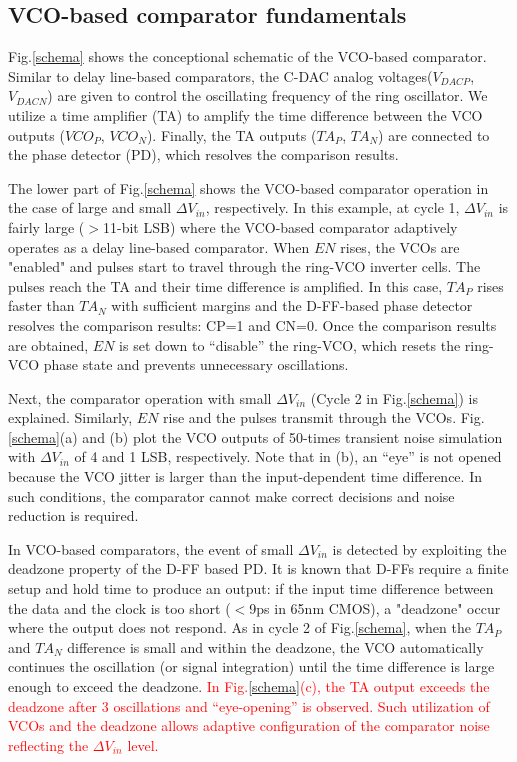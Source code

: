 \documentclass[journal]{IEEEtran}
\begin{document}
\subsection{VCO-based comparator fundamentals}
Fig.\ref{schema} shows the conceptional schematic of the VCO-based comparator. Similar to delay line-based comparators\cite{agnes20089}, the C-DAC analog voltages($V_{DACP}$, $V_{DACN}$) are given to control the oscillating frequency of the ring oscillator. We utilize a time amplifier (TA)\cite{lee20089} to amplify the time difference between the VCO outputs ($VCO_P$, $VCO_N$). Finally, the TA outputs ($TA_P$, $TA_N$) are connected to the phase detector (PD), which resolves the comparison results.

The lower part of Fig.\ref{schema} shows the VCO-based comparator operation in the case of large and small $\Delta V_{in}$, respectively. In this example, at cycle 1, $\Delta V_{in}$ is fairly large ($>$11-bit LSB) where the VCO-based comparator adaptively operates as a delay line-based comparator. When $EN$ rises, the VCOs are "enabled" and pulses start to travel through the ring-VCO inverter cells. The pulses reach the TA and their time difference is amplified. In this case, $TA_P$ rises faster than $TA_N$ with sufficient margins and the D-FF-based phase detector resolves the comparison results: CP=1 and CN=0. Once the comparison results are obtained, $EN$ is set down to “disable” the ring-VCO, which resets the ring-VCO phase state and prevents unnecessary oscillations.

Next, the comparator operation with small $\Delta V_{in}$ (Cycle 2 in Fig.\ref{schema}) is explained. Similarly, $EN$ rise and the pulses transmit through the VCOs. Fig.\ref{schema}(a) and (b) plot the VCO outputs of 50-times transient noise simulation with $\Delta V_{in}$ of 4 and 1 LSB, respectively. Note that in (b), an “eye” is not opened because the VCO jitter is larger than the input-dependent time difference. In such conditions, the comparator cannot make correct decisions and noise reduction is required.

In VCO-based comparators, the event of small $\Delta V_{in}$ is detected by exploiting the deadzone property of the D-FF based PD. It is known that D-FFs require a finite setup and hold time to produce an output: if the input time difference between the data and the clock is too short ($<$9ps in 65nm CMOS), a "deadzone" occur where the output does not respond.
As in cycle 2 of Fig.\ref{schema}, when the $TA_P$ and $TA_N$ difference is small and within the deadzone, the VCO automatically continues the oscillation (or signal integration) until the time difference is large enough to exceed the deadzone. \textcolor{red}{In Fig.\ref{schema}(c), the TA output exceeds the deadzone after 3 oscillations and “eye-opening” is observed. Such utilization of VCOs and the deadzone allows adaptive configuration of the comparator noise reflecting the $\Delta V_{in}$ level.}
\end{document}
